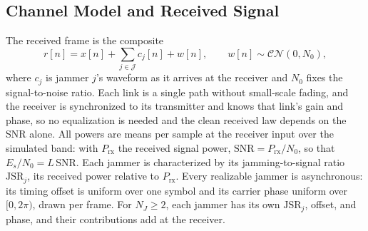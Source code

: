 \subsection{Channel Model and Received Signal}
\label{sec:channel}
The received frame is the composite
\begin{equation}
r[n]=x[n]+\sum_{j\in\mathcal{J}} c_j[n]+w[n],\qquad w[n]\sim\mathcal{CN}(0,N_0),
\label{eq:rx}
\end{equation}
where $c_j$ is jammer $j$'s waveform as it arrives at the receiver and $N_0$ fixes the signal-to-noise ratio.
Each link is a single path without small-scale fading, and the receiver is synchronized to its transmitter and knows that link's gain and phase, so no equalization is needed and the clean received law depends on the SNR alone.
All powers are means per sample at the receiver input over the simulated band: with $P_{\mathrm{rx}}$ the received signal power, $\mathrm{SNR}=P_{\mathrm{rx}}/N_0$, so that $E_s/N_0=L\,\mathrm{SNR}$.
Each jammer is characterized by its jamming-to-signal ratio $\mathrm{JSR}_j$, its received power relative to $P_{\mathrm{rx}}$.
Every realizable jammer is asynchronous: its timing offset is uniform over one symbol and its carrier phase uniform over $[0,2\pi)$, drawn per frame.
For $N_J\!\ge\!2$, each jammer has its own $\mathrm{JSR}_j$, offset, and phase, and their contributions add at the receiver.

